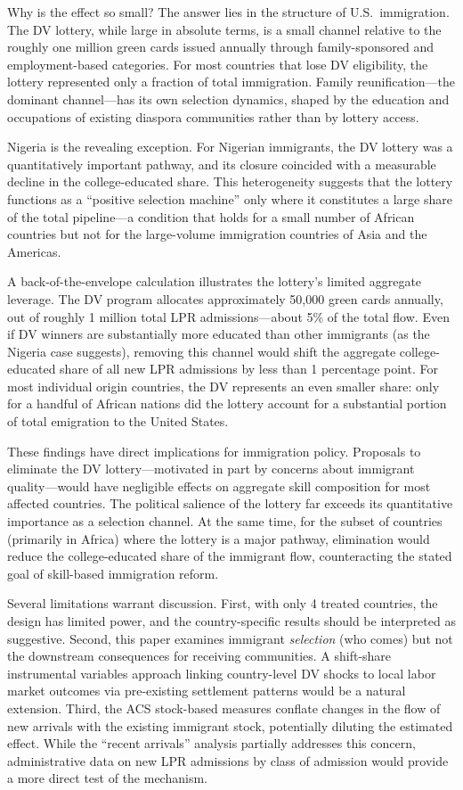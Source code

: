 \documentclass[12pt]{article}
\begin{document}
Why is the effect so small? The answer lies in the structure of U.S.\ immigration. The DV lottery, while large in absolute terms, is a small channel relative to the roughly one million green cards issued annually through family-sponsored and employment-based categories. For most countries that lose DV eligibility, the lottery represented only a fraction of total immigration. Family reunification---the dominant channel---has its own selection dynamics, shaped by the education and occupations of existing diaspora communities rather than by lottery access.

Nigeria is the revealing exception. For Nigerian immigrants, the DV lottery was a quantitatively important pathway, and its closure coincided with a measurable decline in the college-educated share. This heterogeneity suggests that the lottery functions as a ``positive selection machine'' only where it constitutes a large share of the total pipeline---a condition that holds for a small number of African countries but not for the large-volume immigration countries of Asia and the Americas.

A back-of-the-envelope calculation illustrates the lottery's limited aggregate leverage. The DV program allocates approximately 50,000 green cards annually, out of roughly 1 million total LPR admissions---about 5\% of the total flow. Even if DV winners are substantially more educated than other immigrants (as the Nigeria case suggests), removing this channel would shift the aggregate college-educated share of all new LPR admissions by less than 1 percentage point. For most individual origin countries, the DV represents an even smaller share: only for a handful of African nations did the lottery account for a substantial portion of total emigration to the United States.

These findings have direct implications for immigration policy. Proposals to eliminate the DV lottery---motivated in part by concerns about immigrant quality---would have negligible effects on aggregate skill composition for most affected countries. The political salience of the lottery far exceeds its quantitative importance as a selection channel. At the same time, for the subset of countries (primarily in Africa) where the lottery is a major pathway, elimination would reduce the college-educated share of the immigrant flow, counteracting the stated goal of skill-based immigration reform.

Several limitations warrant discussion. First, with only 4 treated countries, the design has limited power, and the country-specific results should be interpreted as suggestive. Second, this paper examines immigrant \textit{selection} (who comes) but not the downstream consequences for receiving communities. A shift-share instrumental variables approach \citep{Beine2011} linking country-level DV shocks to local labor market outcomes via pre-existing settlement patterns would be a natural extension. Third, the ACS stock-based measures conflate changes in the flow of new arrivals with the existing immigrant stock, potentially diluting the estimated effect. While the ``recent arrivals'' analysis partially addresses this concern, administrative data on new LPR admissions by class of admission would provide a more direct test of the mechanism.
\end{document}

